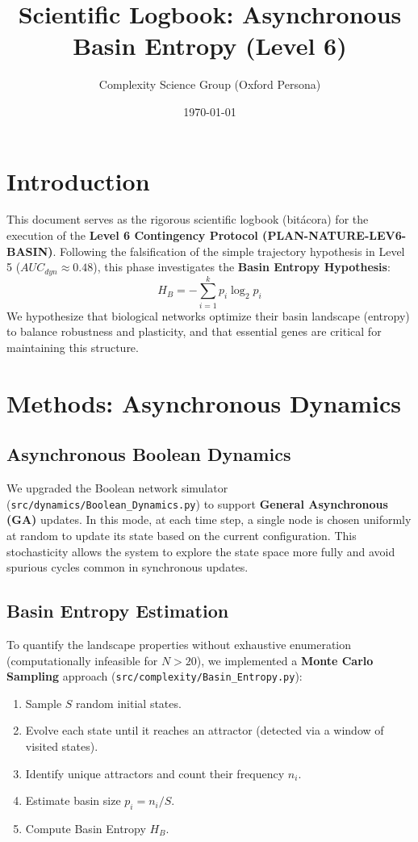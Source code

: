 \documentclass{article}
\title{Scientific Logbook: Asynchronous Basin Entropy (Level 6)}
\author{Complexity Science Group (Oxford Persona)}
\date{\today}
\begin{document}
\maketitle

\tableofcontents

\section{Introduction}
This document serves as the rigorous scientific logbook (bitácora) for the execution of the \textbf{Level 6 Contingency Protocol (PLAN-NATURE-LEV6-BASIN)}. Following the falsification of the simple trajectory hypothesis in Level 5 ($AUC_{dyn} \approx 0.48$), this phase investigates the \textbf{Basin Entropy Hypothesis}:
\[ H_B = - \sum_{i=1}^{k} p_i \log_2 p_i \]
We hypothesize that biological networks optimize their basin landscape (entropy) to balance robustness and plasticity, and that essential genes are critical for maintaining this structure.

\section{Methods: Asynchronous Dynamics}

\subsection{Asynchronous Boolean Dynamics}
We upgraded the Boolean network simulator (\texttt{src/dynamics/Boolean\_Dynamics.py}) to support \textbf{General Asynchronous (GA)} updates. In this mode, at each time step, a single node is chosen uniformly at random to update its state based on the current configuration. This stochasticity allows the system to explore the state space more fully and avoid spurious cycles common in synchronous updates.

\subsection{Basin Entropy Estimation}
To quantify the landscape properties without exhaustive enumeration (computationally infeasible for $N > 20$), we implemented a \textbf{Monte Carlo Sampling} approach (\texttt{src/complexity/Basin\_Entropy.py}):
\begin{enumerate}
    \item Sample $S$ random initial states.
    \item Evolve each state until it reaches an attractor (detected via a window of visited states).
    \item Identify unique attractors and count their frequency $n_i$.
    \item Estimate basin size $p_i = n_i / S$.
    \item Compute Basin Entropy $H_B$.
\end{enumerate}
\end{document}
